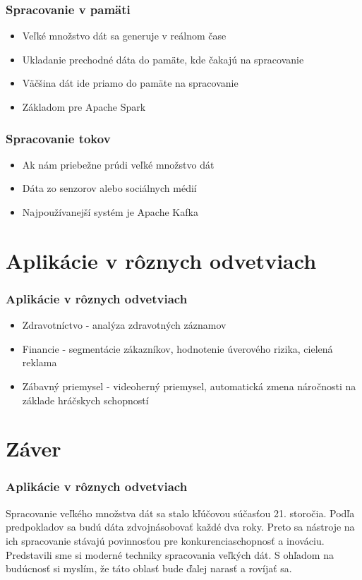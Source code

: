\documentclass{beamer}
\begin{document}
\begin{frame}[fragile=singleslide]\frametitle{Spracovanie v pamäti}
\begin{itemize}
\item Veľké množstvo dát sa generuje v reálnom čase
\item Ukladanie prechodné dáta do pamäte, kde čakajú na spracovanie
\item Väčšina dát ide priamo do pamäte na spracovanie
\item Základom pre Apache Spark
\end{itemize}
\end{frame}


\begin{frame}[fragile=singleslide]\frametitle{Spracovanie tokov}
\begin{itemize}
\item Ak nám priebežne prúdi veľké množstvo dát
\item Dáta zo senzorov alebo sociálnych médií
\item Najpoužívanejší systém je Apache Kafka
\end{itemize}
\end{frame}


\section{Aplikácie v rôznych odvetviach}

\begin{frame}[fragile=singleslide]\frametitle{Aplikácie v rôznych odvetviach}
\begin{itemize}
\item Zdravotníctvo - analýza zdravotných záznamov
\item Financie - segmentácie zákazníkov, hodnotenie úverového rizika, cielená reklama
\item Zábavný priemysel - videoherný priemysel, automatická zmena náročnosti na základe hráčskych schopností
\end{itemize}
\end{frame}


\section*{Záver}
\begin{frame}[fragile=singleslide]\frametitle{Aplikácie v rôznych odvetviach}
Spracovanie veľkého množstva dát sa stalo kľúčovou súčasťou 21. storočia. Podľa predpokladov sa budú dáta zdvojnásobovať každé dva roky. Preto sa nástroje na ich spracovanie stávajú povinnosťou pre konkurenciaschopnosť a inováciu. Predstavili sme si moderné techniky spracovania veľkých dát. S ohľadom na budúcnosť si myslím, že táto oblasť bude ďalej narasť a rovíjať sa.
\end{frame}
\end{document}
